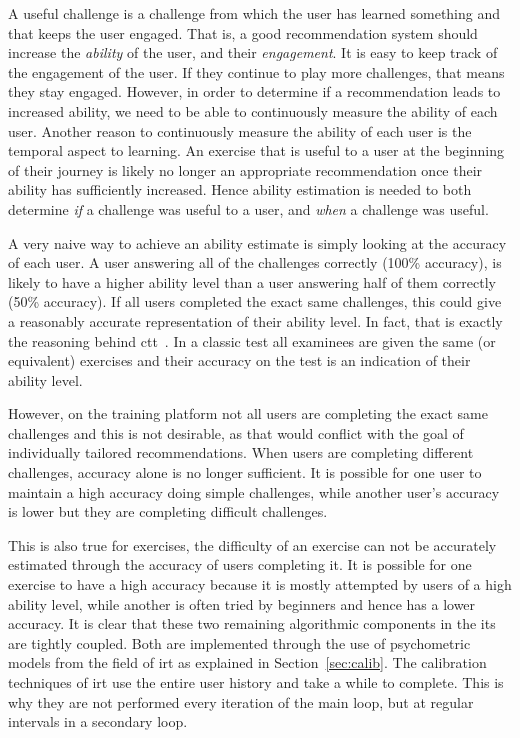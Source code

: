 A useful challenge is a challenge from which the user has learned something and that keeps the user engaged.
That is, a good recommendation system should increase the \textit{ability} of the user, and their \textit{engagement}.
It is easy to keep track of the engagement of the user.
If they continue to play more challenges, that means they stay engaged.
However, in order to determine if a recommendation leads to increased ability, we need to be able to continuously measure the ability of each user.
Another reason to continuously measure the ability of each user is the temporal aspect to learning.
An exercise that is useful to a user at the beginning of their journey is likely no longer an appropriate recommendation once their ability has sufficiently increased.
Hence ability estimation is needed to both determine \textit{if} a challenge was useful to a user, and \textit{when} a challenge was useful.

A very naive way to achieve an ability estimate is simply looking at the accuracy of each user.
A user answering all of the challenges correctly (100\% accuracy), is likely to have a higher ability level than a user answering half of them correctly (50\% accuracy).
If all users completed the exact same challenges, this could give a reasonably accurate representation of their ability level.
In fact, that is exactly the reasoning behind \gls{ctt}~\cite{ctt}.
In a classic test all examinees are given the same (or equivalent) exercises and their accuracy on the test is an indication of their ability level.

However, on the training platform not all users are completing the exact same challenges and this is not desirable, as that would conflict with the goal of individually tailored recommendations.
When users are completing different challenges, accuracy alone is no longer sufficient.
It is possible for one user to maintain a high accuracy doing simple challenges, while another user's accuracy is lower but they are completing difficult challenges.

This is also true for exercises, the difficulty of an exercise can not be accurately estimated through the accuracy of users completing it.
It is possible for one exercise to have a high accuracy because it is mostly attempted by users of a high ability level, while another is often tried by beginners and hence has a lower accuracy.
It is clear that these two remaining algorithmic components in the \gls{its} are tightly coupled.
Both are implemented through the use of psychometric models from the field of \gls{irt} as explained in Section~\ref{sec:calib}.
The calibration techniques of \gls{irt} use the entire user history and take a while to complete.
This is why they are not performed every iteration of the main loop, but at regular intervals in a secondary loop.
